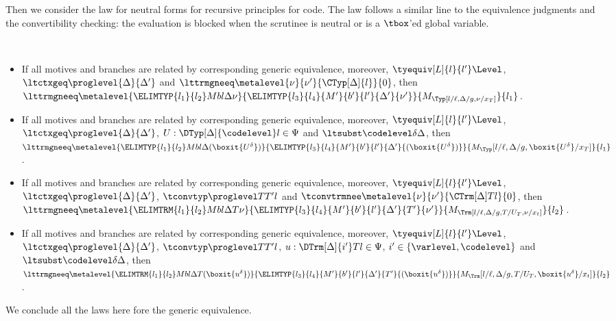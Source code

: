 Then we consider the law for neutral forms for recursive principles for code. %
The law follows a similar line to the equivalence judgments and the convertibility
checking: the evaluation is blocked when the scrutinee is neutral or is a $\tbox$'ed
global variable. 
\begin{law} $ $
  \begin{itemize}
  \item If all motives and branches are related by corresponding generic equivalence,
    moreover, $\tyequiv[L]{l}{l'}\Level$, $\ltctxgeq \proglevel{\Delta}{\Delta'}$ and
    $\lttrmgneeq \metalevel{\nu}{\nu'}{\CTyp[\Delta]{l}}{0}$, then \newline
    $\lttrmgneeq \metalevel{\ELIMTYP{l_1}{l_2}Mbl\Delta
      \nu}{\ELIMTYP{l_3}{l_4}{M'}{b'}{l'}{\Delta'}{\nu'}}{M_\Typ[l/\ell,\Delta/g,\nu/x_T]}{l_1}$. 
  \item If all motives and branches are related by corresponding generic equivalence,
    moreover, $\tyequiv[L]{l}{l'}\Level$, $\ltctxgeq \proglevel{\Delta}{\Delta'}$,
    $U : \DTyp[\Delta]{\codelevel} l \in \Psi$ and $\ltsubst \codelevel \delta \Delta$, then \newline
    $\lttrmgneeq \metalevel{\ELIMTYP{l_1}{l_2}Mbl\Delta{(\boxit{U^\delta})}}{\ELIMTYP{l_3}{l_4}{M'}{b'}{l'}{\Delta'}{(\boxit{U^\delta})}}{M_\Typ[l/\ell,\Delta/g,\boxit{U^\delta}/x_T]}{l_1}$.
  \item If all motives and branches are related by corresponding generic equivalence,
    moreover, $\tyequiv[L]{l}{l'}\Level$, $\ltctxgeq \proglevel{\Delta}{\Delta'}$,
    $\tconvtyp \proglevel T{T'}{l}$ and
    $\tconvtrmnee \metalevel{\nu}{\nu'}{\CTrm[\Delta]T{l}}{0}$, then \newline
    $\lttrmgneeq \metalevel{\ELIMTRM{l_1}{l_2}Mbl\Delta T \nu}{\ELIMTYP{l_3}{l_4}{M'}{b'}{l'}{\Delta'}{T'}{\nu'}}{M_\Trm[l/\ell,\Delta/g,T/U_T,\nu/x_t]}{l_2}$.
  \item If all motives and branches are related by corresponding generic equivalence,
    moreover, $\tyequiv[L]{l}{l'}\Level$, $\ltctxgeq \proglevel{\Delta}{\Delta'}$,
    $\tconvtyp \proglevel T{T'}{l}$, $u : \DTrm[\Delta]{i'}T l \in \Psi$,
    $ i' \in \{\varlevel, \codelevel\}$ and $\ltsubst \codelevel \delta \Delta$, then \newline
    $\lttrmgneeq \metalevel{\ELIMTRM{l_1}{l_2}Mbl\Delta T
      {(\boxit{u^\delta})}}{\ELIMTYP{l_3}{l_4}{M'}{b'}{l'}{\Delta'}{T'}{(\boxit{u^\delta})}}{M_\Trm[l/\ell,\Delta/g,T/U_T,\boxit{u^\delta}/x_t]}{l_2}$.
  \end{itemize}
\end{law}
We conclude all the laws here fore the generic equivalence.

